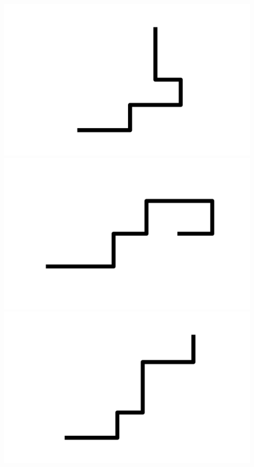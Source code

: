 \documentclass[]{report}
\begin{document}
\includegraphics[scale=.1]{pictures/21/state_cluster_shapes_319.pdf} 
\includegraphics[scale=.1]{pictures/21/state_cluster_shapes_320.pdf} 
\includegraphics[scale=.1]{pictures/21/state_cluster_shapes_321.pdf} 
\end{document}

